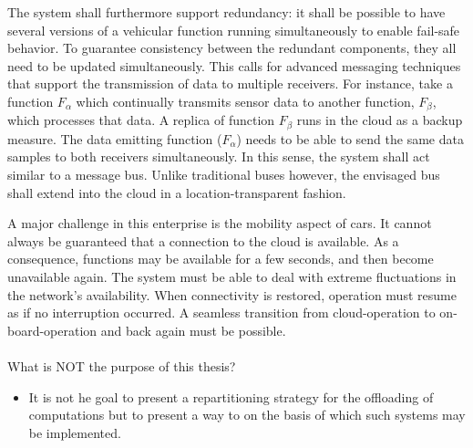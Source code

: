 The system shall furthermore support redundancy: it shall be possible to have several versions of a vehicular function running simultaneously to enable fail-safe behavior. To guarantee consistency between the redundant components, they all need to be updated simultaneously. This calls for advanced messaging techniques that support the transmission of data to multiple receivers. For instance, take a function $F_\alpha$ which continually transmits sensor data to another function, $F_\beta$, which processes that data. A replica of function $F_\beta$ runs in the cloud as a backup measure. The data emitting function ($F_\alpha$) needs to be able to send the same data samples to both receivers simultaneously. In this sense, the system shall act similar to a message bus. Unlike traditional buses however, the envisaged bus shall extend into the cloud in a location-transparent fashion.

A major challenge in this enterprise is the mobility aspect of cars. It cannot always be guaranteed that a connection to the cloud is available. As a consequence, functions may be available for a few seconds, and then become unavailable again. The system must be able to deal with extreme fluctuations in the network's availability. When connectivity is restored, operation must resume as if no interruption occurred. A seamless transition from cloud-operation to on-board-operation and back again must be possible.


\paragraph{}

What is NOT the purpose of this thesis?
\begin{itemize}
\item It is not he goal to present a repartitioning strategy for the offloading of computations but to present a way to on the basis of which such systems may be implemented.
\end{itemize}


%
%
%
%
%
%
%
%
%
%


